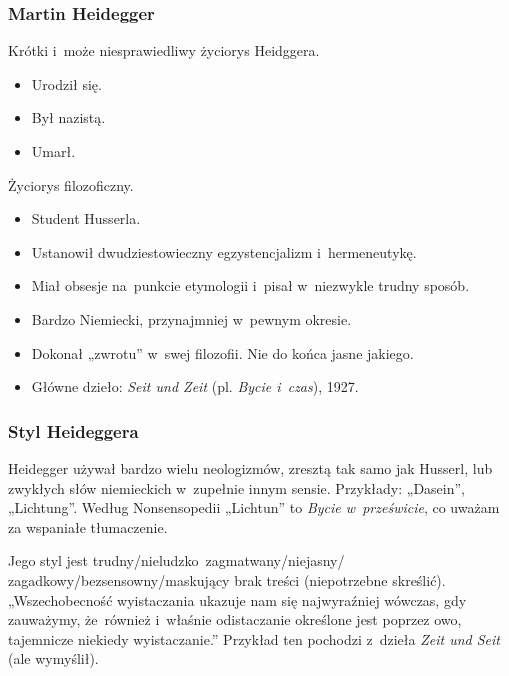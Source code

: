 \documentclass[10pt,t]{beamer}
\begin{document}
\begin{frame}
  \frametitle{Martin Heidegger}

  Krótki i~może niesprawiedliwy życiorys Heidggera.
  \begin{itemize}

  \item Urodził się.

  \item Był nazistą.

  \item Umarł.

  \end{itemize}

  Życiorys filozoficzny.
  \begin{itemize}

  \item Student Husserla.

  \item Ustanowił dwudziestowieczny egzystencjalizm
    i~hermeneutykę.

  \item Miał obsesje na~punkcie etymologii i~pisał w~niezwykle trudny
    sposób.

  \item Bardzo Niemiecki, przynajmniej w~pewnym okresie.

  \item Dokonał „zwrotu” w~swej filozofii. Nie do końca jasne jakiego.

  \item Główne dzieło: \textit{Seit und Zeit} (pl. \textit{Bycie i~czas}),
    1927.

  \end{itemize}

\end{frame}





\begin{frame}
  \frametitle{Styl Heideggera}


  Heidegger używał bardzo wielu neologizmów, zresztą tak samo jak Husserl,
  lub zwykłych słów niemieckich w~zupełnie innym sensie. Przykłady:
  „Dasein”, „Lichtung”. Według Nonsensopedii „Lichtun” to \textit{Bycie
    w~prześwicie}, co uważam za wspaniałe tłumaczenie.

  Jego styl jest trudny/nieludzko~zagmatwany/niejasny/
  zagadkowy/bezsensowny/maskujący brak treści (niepotrzebne
  skreślić). „Wszechobecność wyistaczania ukazuje nam się
  najwyraźniej wówczas, gdy zauważymy, że~również i~właśnie
  odistaczanie określone jest poprzez owo, tajemnicze niekiedy
  wyistaczanie.” Przykład ten pochodzi z~dzieła \textit{Zeit und Seit} (ale
  wymyślił).

\end{frame}
\end{document}
